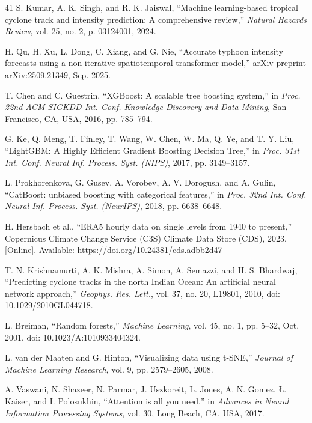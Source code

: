 \documentclass[conference]{IEEEtran}
\begin{document}
\begin{thebibliography}{41}
S. Kumar, A. K. Singh, and R. K. Jaiswal, ``Machine learning-based tropical cyclone track and intensity prediction: A comprehensive review,'' \textit{Natural Hazards Review}, vol. 25, no. 2, p. 03124001, 2024.

H. Qu, H. Xu, L. Dong, C. Xiang, and G. Nie, ``Accurate typhoon intensity forecasts using a non-iterative spatiotemporal transformer model,'' arXiv preprint arXiv:2509.21349, Sep. 2025.

T. Chen and C. Guestrin, ``XGBoost: A scalable tree boosting system,'' in \textit{Proc. 22nd ACM SIGKDD Int. Conf. Knowledge Discovery and Data Mining}, San Francisco, CA, USA, 2016, pp. 785--794.

G. Ke, Q. Meng, T. Finley, T. Wang, W. Chen, W. Ma, Q. Ye, and T. Y. Liu, ``LightGBM: A Highly Efficient Gradient Boosting Decision Tree,'' in \textit{Proc. 31st Int. Conf. Neural Inf. Process. Syst. (NIPS)}, 2017, pp. 3149--3157.

L. Prokhorenkova, G. Gusev, A. Vorobev, A. V. Dorogush, and A. Gulin, ``CatBoost: unbiased boosting with categorical features,'' in \textit{Proc. 32nd Int. Conf. Neural Inf. Process. Syst. (NeurIPS)}, 2018, pp. 6638--6648.

H. Hersbach et al., ``ERA5 hourly data on single levels from 1940 to present,'' Copernicus Climate Change Service (C3S) Climate Data Store (CDS), 2023. [Online]. Available: https://doi.org/10.24381/cds.adbb2d47

T. N. Krishnamurti, A. K. Mishra, A. Simon, A. Semazzi, and H. S. Bhardwaj, ``Predicting cyclone tracks in the north Indian Ocean: An artificial neural network approach,'' \textit{Geophys. Res. Lett.}, vol. 37, no. 20, L19801, 2010, doi: 10.1029/2010GL044718.

L. Breiman, ``Random forests,'' \textit{Machine Learning}, vol. 45, no. 1, pp. 5--32, Oct. 2001, doi: 10.1023/A:1010933404324.

L. van der Maaten and G. Hinton, ``Visualizing data using t-SNE,'' \textit{Journal of Machine Learning Research}, vol. 9, pp. 2579--2605, 2008.

A. Vaswani, N. Shazeer, N. Parmar, J. Uszkoreit, L. Jones, A. N. Gomez, \L. Kaiser, and I. Polosukhin, ``Attention is all you need,'' in \textit{Advances in Neural Information Processing Systems}, vol. 30, Long Beach, CA, USA, 2017.


\end{thebibliography}
\end{document}
